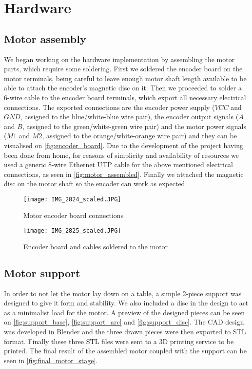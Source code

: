 \section{Hardware} \label{sec:hardware-devel}

\subsection{Motor assembly}
We began working on the hardware implementation by assembling the motor parts, which require some soldering.
First we soldered the encoder board on the motor terminals, being careful to leave enough motor shaft length available to be able to attach the encoder's magnetic disc on it.
Then we proceeded to solder a 6-wire cable to the encoder board terminals, which export all necessary electrical connections.
The exported connections are the encoder power supply ($VCC$ and $GND$, assigned to the blue/white-blue wire pair), the encoder output signals ($A$ and $B$, assigned to the green/white-green wire pair) and the motor power signals ($M1$ and $M2$, assigned to the orange/white-orange wire pair) and they can be visualised on \autoref{fig:encoder_board}.
Due to the development of the project having been done from home, for reasons of simplicity and availability of resources we used a generic 8-wire Ethernet UTP cable for the above mentioned electrical connections, as seen in \autoref{fig:motor_assembled}.
Finally we attached the magnetic disc on the motor shaft so the encoder can work as expected.

\begin{figure}[htp]
	\centering
	\texttt{[image: IMG\_2824\_scaled.JPG]}
	\caption{Motor encoder board connections}
	\label{fig:encoder_board}
\end{figure}

\begin{figure}[htp]
	\centering
	\texttt{[image: IMG\_2825\_scaled.JPG]}
	\caption{Encoder board and cables soldered to the motor}
	\label{fig:motor_assembled}
\end{figure}

\subsection{Motor support}
In order to not let the motor lay down on a table, a simple 2-piece support was designed to give it form and stability.
We also included a disc in the design to act as a minimalist load for the motor.
A preview of the designed pieces can be seen on \autoref{fig:support_base}, \autoref{fig:support_arc} and \autoref{fig:support_disc}.
The CAD design was developed in Blender \cite{sw:blender} and the three drawn pieces were then exported to STL format.
Finally these three STL files were sent to a 3D printing service to be printed.
The final result of the assembled motor coupled with the support can be seen in \autoref{fig:final_motor_stage}.

